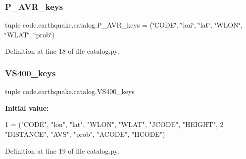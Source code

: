 \subsubsection{\texorpdfstring{P\+\_\+\+A\+V\+R\+\_\+keys}{P\_AVR\_keys}}
{\footnotesize\ttfamily tuple code.\+earthquake.\+catalog.\+P\+\_\+\+A\+V\+R\+\_\+keys = (\char`\"{}C\+O\+DE\char`\"{}, \char`\"{}lon\char`\"{}, \char`\"{}lat\char`\"{}, \char`\"{}W\+L\+ON\char`\"{}, \char`\"{}W\+L\+AT\char`\"{}, \char`\"{}prob\char`\"{})}



Definition at line 18 of file catalog.\+py.

\mbox{\label{namespacecode_1_1earthquake_1_1catalog_a652468120d0f5522e4cf3c98f6674b31}} 
\subsubsection{\texorpdfstring{V\+S400\+\_\+keys}{VS400\_keys}}
{\footnotesize\ttfamily tuple code.\+earthquake.\+catalog.\+V\+S400\+\_\+keys}

{\bfseries Initial value\+:}
\begin{DoxyCode}
1 =  (\textcolor{stringliteral}{"CODE"}, \textcolor{stringliteral}{"lon"}, \textcolor{stringliteral}{"lat"}, \textcolor{stringliteral}{"WLON"}, \textcolor{stringliteral}{"WLAT"}, \textcolor{stringliteral}{"JCODE"}, \textcolor{stringliteral}{"HEIGHT"},
2             \textcolor{stringliteral}{"DISTANCE"}, \textcolor{stringliteral}{"AVS"}, \textcolor{stringliteral}{"prob"}, \textcolor{stringliteral}{"ACODE"}, \textcolor{stringliteral}{"HCODE"})
\end{DoxyCode}


Definition at line 19 of file catalog.\+py.

